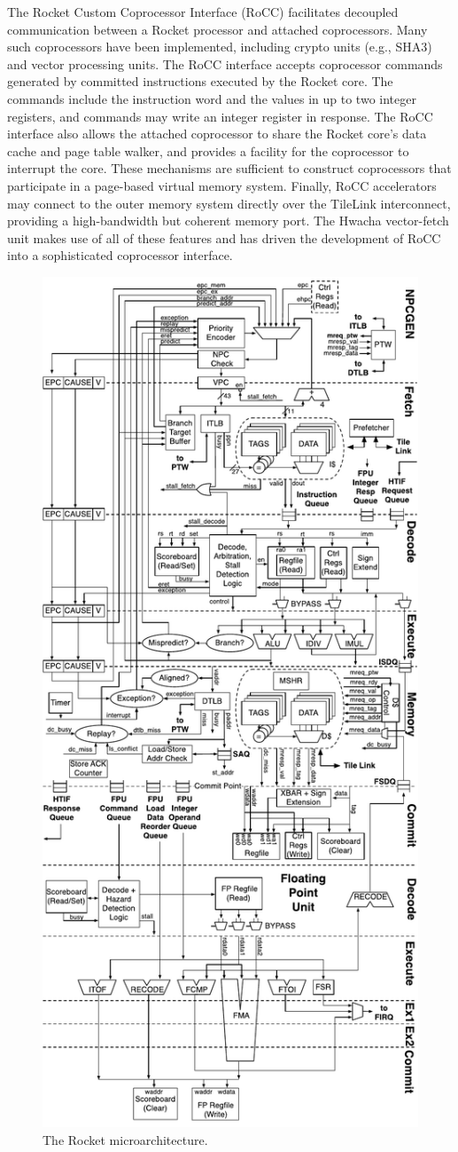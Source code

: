 The Rocket Custom Coprocessor Interface (RoCC) facilitates decoupled communication between a Rocket processor and attached coprocessors. Many such coprocessors have been implemented, including crypto units (e.g., SHA3) and vector processing units. The RoCC interface accepts coprocessor commands generated by committed instructions executed by the Rocket core. The commands include the instruction word and the values in up to two integer registers, and commands may write an integer register in response. The RoCC interface also allows the attached coprocessor to share the Rocket core's data cache and page table walker, and provides a facility for the coprocessor to interrupt the core. These mechanisms are sufficient to construct coprocessors that participate in a page-based virtual memory system. Finally, RoCC accelerators may connect to the outer memory system directly over the TileLink interconnect, providing a high-bandwidth but coherent memory port. The Hwacha vector-fetch unit makes use of all of these features and has driven the development of RoCC into a sophisticated coprocessor interface.

\begin{figure}[htbp]
    \centering
    \includegraphics[width=0.65\linewidth]{Images/03_RocketCore_RISCV_Rocket6pipeline.pdf}
    \caption{The Rocket microarchitecture.}
    \label{fig:rocket_core_microarchitecture}
\end{figure}


